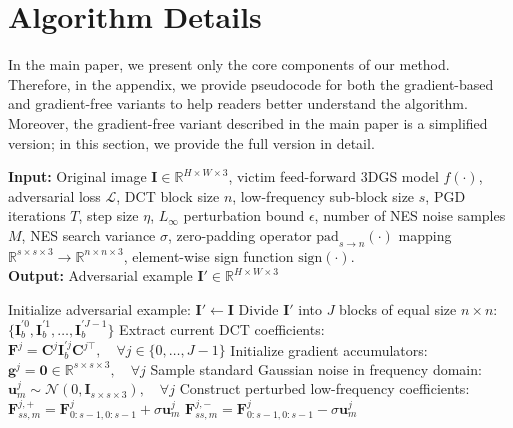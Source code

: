 \section{Algorithm Details}
In the main paper, we present only the core components of our method. Therefore, in the appendix, we provide pseudocode for both the gradient-based and gradient-free variants to help readers better understand the algorithm. Moreover, the gradient-free variant described in the main paper is a simplified version; in this section, we provide the full version in detail.

\begin{algorithm}[h]
\caption{Gradient-Based Frequency-Domain Black-Box Attack}
\label{alg:freq_nes_pgd}
\textbf{Input:} Original image $\bm{I}\in \mathbb{R}^{H \times W \times 3}$, victim feed-forward 3DGS model $f(\cdot)$, adversarial loss $\mathcal{L}$, DCT block size $n$, low-frequency sub-block size $s$, PGD iterations $T$, step size $\eta$, $L_\infty$ perturbation bound $\epsilon$, number of NES noise samples $M$, NES search variance $\sigma$, zero-padding operator $\text{pad}_{s \to n}(\cdot)$ mapping $\mathbb{R}^{s \times s \times 3} \to \mathbb{R}^{n \times n \times 3}$, element-wise sign function $\text{sign}(\cdot)$. \\
\textbf{Output:} Adversarial example $\bm{I}'\in \mathbb{R}^{H \times W \times 3}$
\begin{algorithmic}[1] %
\State Initialize adversarial example: $\bm{I}' \leftarrow \bm{I}$
    \State Divide $\bm{I}'$ into $J$ blocks of equal size $n \times n$: $\{\bm{I}_b^{\prime 0}, \bm{I}_b^{\prime 1}, \dots, \bm{I}_b^{\prime J-1}\}$
    \State Extract current DCT coefficients: $\bm{F}^j = \bm{C}^j \bm{I}_b^{\prime j} \bm{C}^{j\top}, \quad \forall j \in \{0, \dots, J-1\}$
    \State Initialize gradient accumulators: $\mathbf{g}^j = \mathbf{0} \in \mathbb{R}^{s \times s \times 3}, \quad \forall j$
    \vspace{0.05cm}
        \State Sample standard Gaussian noise in frequency domain:
        \Statex \hspace{4em}$\mathbf{u}_m^j \sim \mathcal{N}(0, \mathbf{I}_{s \times s \times 3}), \quad \forall j$
        \State Construct perturbed low-frequency coefficients:
        \State \quad $\bm{F}_{ss, m}^{j, +} = \bm{F}_{0:s-1, 0:s-1}^j + \sigma \mathbf{u}_m^j$
        \State \quad $\bm{F}_{ss, m}^{j, -} = \bm{F}_{0:s-1, 0:s-1}^j - \sigma \mathbf{u}_m^j$

\end{algorithmic}
\end{algorithm}
